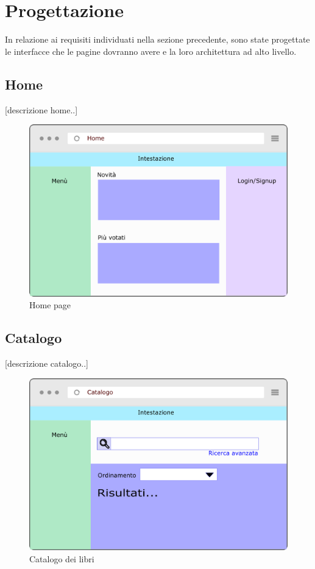 \section{Progettazione}
In relazione ai requisiti individuati nella sezione precedente, sono state progettate le interfacce che le pagine dovranno avere e la loro architettura ad alto livello.


\subsection{Home}
[descrizione home..]
\begin{figure}[H]
	\centering
	\includegraphics[width= 14cm]{immagini/home.png}
	\caption{Home page}
\end{figure}

\subsection{Catalogo}
[descrizione catalogo..]
\begin{figure}[H]
	\centering
	\includegraphics[width= 14cm]{immagini/catalogo.png}
	\caption{Catalogo dei libri}
\end{figure}

